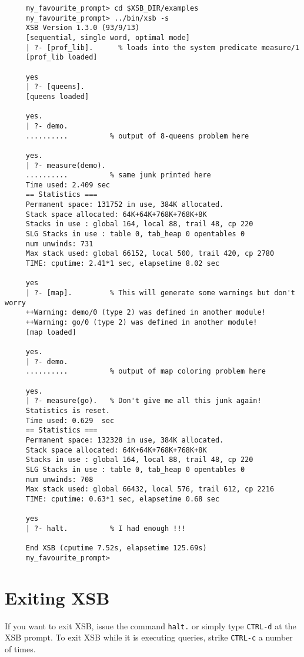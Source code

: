 {\footnotesize
 \begin{verbatim}
     my_favourite_prompt> cd $XSB_DIR/examples
     my_favourite_prompt> ../bin/xsb -s
     XSB Version 1.3.0 (93/9/13)
     [sequential, single word, optimal mode]
     | ?- [prof_lib].      % loads into the system predicate measure/1
     [prof_lib loaded]

     yes
     | ?- [queens].
     [queens loaded]

     yes.
     | ?- demo.
     ..........          % output of 8-queens problem here

     yes.
     | ?- measure(demo).
     ..........          % same junk printed here
     Time used: 2.409 sec
     == Statistics ===      
     Permanent space: 131752 in use, 384K allocated.
     Stack space allocated: 64K+64K+768K+768K+8K
     Stacks in use : global 164, local 88, trail 48, cp 220
     SLG Stacks in use : table 0, tab_heap 0 opentables 0
     num unwinds: 731
     Max stack used: global 66152, local 500, trail 420, cp 2780
     TIME: cputime: 2.41*1 sec, elapsetime 8.02 sec

     yes
     | ?- [map].         % This will generate some warnings but don't worry
     ++Warning: demo/0 (type 2) was defined in another module!
     ++Warning: go/0 (type 2) was defined in another module!
     [map loaded]

     yes.
     | ?- demo.
     ..........          % output of map coloring problem here

     yes.
     | ?- measure(go).   % Don't give me all this junk again!
     Statistics is reset.
     Time used: 0.629  sec
     == Statistics ===      
     Permanent space: 132328 in use, 384K allocated.
     Stack space allocated: 64K+64K+768K+768K+8K
     Stacks in use : global 164, local 88, trail 48, cp 220
     SLG Stacks in use : table 0, tab_heap 0 opentables 0
     num unwinds: 708
     Max stack used: global 66432, local 576, trail 612, cp 2216
     TIME: cputime: 0.63*1 sec, elapsetime 0.68 sec

     yes
     | ?- halt.          % I had enough !!!

     End XSB (cputime 7.52s, elapsetime 125.69s)
     my_favourite_prompt>
 \end{verbatim}
}


\section{Exiting XSB}

If you want to exit XSB, issue the command \verb'halt.' or
simply type \verb'CTRL-d' at the XSB prompt. To exit XSB while it is
executing queries, strike \verb'CTRL-c' a number of times.


